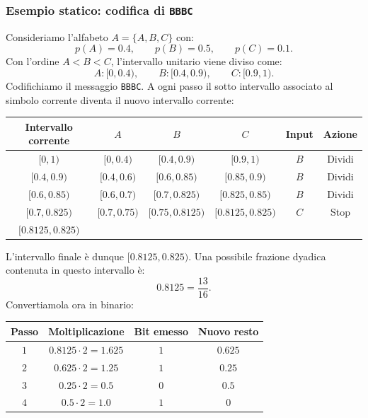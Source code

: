 \documentclass{article}
\theoremstyle{definition}
\numberwithin{equation}{section}
\begin{document}
\subsubsection{Esempio statico: codifica di \texttt{BBBC}}
Consideriamo l'alfabeto $A=\{A,B,C\}$ con:
\[
    p(A)=0.4,\qquad p(B)=0.5,\qquad p(C)=0.1.
\]
Con l'ordine $A<B<C$, l'intervallo unitario viene diviso come:
\[
    A:[0,0.4),\qquad
    B:[0.4,0.9),\qquad
    C:[0.9,1).
\]
Codifichiamo il messaggio \texttt{BBBC}. A ogni passo il sotto intervallo associato al simbolo corrente diventa il nuovo intervallo corrente:
\begin{center}
    \begingroup
    \footnotesize
    \setlength{\tabcolsep}{3pt}
    \renewcommand{\arraystretch}{1.28}
    \begin{tabular}{|c|c|c|c|c|c|}
        \hline
        \textbf{Intervallo corrente}  & \textbf{$A$}          & \textbf{$B$}               & \textbf{$C$}                  & \textbf{Input} & \textbf{Azione} \\ \hline
        $[0,1)$                       & $[0,0.4)$             & $\boldsymbol{[0.4,0.9)}$   & $[0.9,1)$                     & $B$            & Dividi          \\ \hline
        $[0.4,0.9)$                   & $[0.4,0.6)$           & $\boldsymbol{[0.6,0.85)}$  & $[0.85,0.9)$                  & $B$            & Dividi          \\ \hline
        $[0.6,0.85)$                  & $[0.6,0.7)$           & $\boldsymbol{[0.7,0.825)}$ & $[0.825,0.85)$                & $B$            & Dividi          \\ \hline
        $[0.7,0.825)$                 & $[0.7,0.75)$          & $[0.75,0.8125)$            & $\boldsymbol{[0.8125,0.825)}$ & $C$            & Stop            \\ \hline
        $\boldsymbol{[0.8125,0.825)}$ & \multicolumn{5}{c|}{}                                                                                                 \\ \hline
    \end{tabular}
    \endgroup
\end{center}
L'intervallo finale è dunque $[0.8125,0.825)$. Una possibile frazione dyadica contenuta in questo intervallo è:
\[
    0.8125
    =
    \frac{13}{16}.
\]
Convertiamola ora in binario:
\begin{center}
    \begin{tabular}{|c|c|c|c|}
        \hline
        \textbf{Passo} & \textbf{Moltiplicazione} & \textbf{Bit emesso} & \textbf{Nuovo resto} \\ \hline
        $1$            & $0.8125\cdot 2=1.625$    & $1$                 & $0.625$              \\ \hline
        $2$            & $0.625\cdot 2=1.25$      & $1$                 & $0.25$               \\ \hline
        $3$            & $0.25\cdot 2=0.5$        & $0$                 & $0.5$                \\ \hline
        $4$            & $0.5\cdot 2=1.0$         & $1$                 & $0$                  \\ \hline
    \end{tabular}
\end{center}
\end{document}
